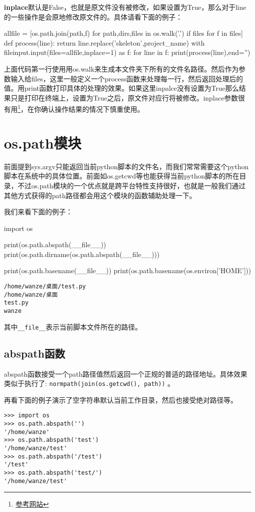 \documentclass[12pt,oneside]{book}
\begin{document}
\begin{common-format}
\textbf{inplace}默认是False，也就是原文件没有被修改，如果设置为True，那么对于line的一些操作是会原地修改原文件的。具体请看下面的例子：
\begin{tcbpython}[]
allfile = [os.path.join(path,f) for path,dirs,files in os.walk('.')
        if files for f in files]
def process(line):
    return line.replace('skeleton',project_name)
with fileinput.input(files=allfile,inplace=1) as f:
    for line in f:
        print(process(line),end='')
\end{tcbpython}
上面代码第一行使用用os.walk来生成本文件夹下所有的文件名路径。然后作为参数输入给files，这里一般定义一个process函数来处理每一行，然后返回处理后的值。用print函数打印具体的处理的效果。如果这里inpalce没有设置为True那么结果只是打印在终端上，设置为True之后，原文件对应行将被修改。inplace参数很有用\footnote{\href{http://ruslanspivak.com/2010/10/20/in-place-file-rewrite-with-fileinput/}{参考网站}}，在你确认操作结果的情况下慎重使用。


\chapter{os.path模块}
前面提到sys.argv只能返回当前python脚本的文件名，而我们常常需要这个python脚本在系统中的具体位置。前面如os.getcwd等也能获得当前python脚本的所在目录，不过os.path模块的一个优点就是跨平台特性支持很好，也就是一般我们通过其他方式获得的path路径都会用这个模块的函数辅助处理一下。

我们来看下面的例子：
\begin{tcbpython}[]
import os

print(os.path.abspath(__file__))
print(os.path.dirname(os.path.abspath(__file__)))

print(os.path.basename(__file__))
print(os.path.basename(os.environ['HOME']))

\end{tcbpython}
\begin{Verbatim}
/home/wanze/桌面/test.py
/home/wanze/桌面
test.py
wanze
\end{Verbatim}

其中\verb+__file__+表示当前脚本文件所在的路径。

\section{abspath函数}
abspath函数接受一个path路径值然后返回一个正规的普适的路径地址。具体效果类似于执行了: \verb+normpath(join(os.getcwd(), path))+ 。

再看下面的例子演示了空字符串默认当前工作目录，然后也接受绝对路径等。
\begin{Verbatim}
>>> import os
>>> os.path.abspath('')
'/home/wanze'
>>> os.path.abspath('test')
'/home/wanze/test'
>>> os.path.abspath('/test')
'/test'
>>> os.path.abspath('test/')
'/home/wanze/test'
\end{Verbatim}


\end{common-format}
\end{document}
